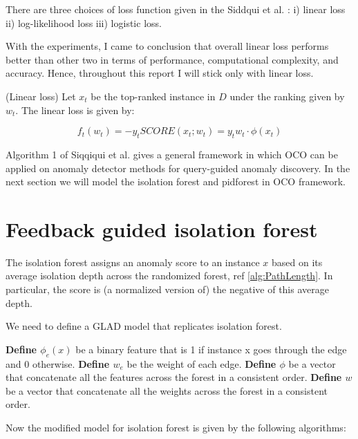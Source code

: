 There are three choices of loss function given in the Siddqui et al. \cite{10.1145/3219819.3220083}: i) linear loss ii) log-likelihood loss iii) logistic loss. 

With the experiments, I came to conclusion that overall linear loss performs better than other two in terms of performance, computational complexity, and accuracy.
Hence, throughout this report I will stick only with linear loss.

\begin{defn}
    \label{defn:linear-loss}
    (Linear loss)
    Let $x_t$ be the top-ranked instance in $D$ under the ranking given by $w_t$.
    The linear loss is given by:

    \vspace{-2em}
    \begin{equation}
        \label{eq:linear-loss}
        f_t(w_t) = -y_t SCORE(x_t;w_t) = y_t w_t \cdot \phi (x_t)
    \end{equation}
\end{defn}

Algorithm 1 of Siqqiqui et al. \cite{10.1145/3219819.3220083} gives a general framework in which OCO can be applied on anomaly detector methods for query-guided anomaly discovery.
In the next section we will model the isolation forest and pidforest in OCO framework.


\section{Feedback guided isolation forest}
\label{sec:feedback-guided-iforest}

The isolation forest assigns an anomaly score to an instance $x$ based on its average isolation depth across the randomized forest, ref \ref{alg:PathLength}.
In particular, the score is (a normalized version of) the negative of
this average depth.

We need to define a GLAD model that replicates isolation forest.

\textbf{Define $\phi_e(x)$} be a binary feature that is 1 if instance x goes through the edge and 0 otherwise.
\textbf{Define $w_e$} be the weight of each edge.
\textbf{Define $\phi$}  be a vector that concatenate all the features across the forest in a consistent order.
\textbf{Define $w$}  be a vector that concatenate all the weights across the forest in a consistent order.

Now the modified model for isolation forest is given by the following algorithms:

